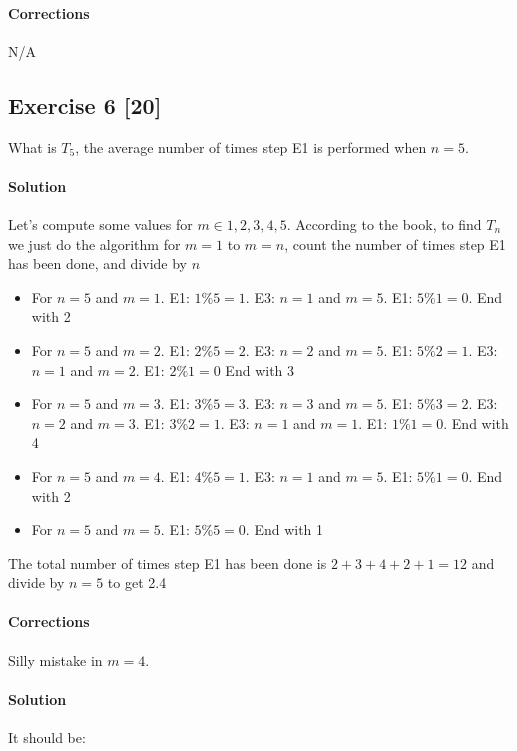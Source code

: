 \documentclass{report}
\begin{document}
			\paragraph{Corrections} N/A
			
		
		\subsection*{Exercise 6 [20]}
		
			What is $T_5$, the average number of times step E1 is performed when $n=5$.
			
			\paragraph{Solution} Let's compute some values for $m \in {1,2,3,4,5}$. According to the book, to find $T_n$ we just do the algorithm for $m=1$ to $m=n$, count the number of times step E1 has been done, and divide by $n$
			
			\begin{itemize}
				\item For $n=5$ and $m=1$. E1: $1\%5 = 1$. E3: $n=1$ and $m=5$. E1: $5\%1=0$. End with 2
				
				\item For $n=5$ and $m=2$. E1: $2\%5 = 2$. E3: $n=2$ and $m=5$. E1: $5\%2=1$. E3: $n=1$ and $m=2$. E1: $2\%1 = 0$ End with 3
				
				\item For $n=5$ and $m=3$. E1: $3\%5 = 3$. E3: $n=3$ and $m=5$. E1: $5\%3=2$. E3: $n=2$ and $m=3$. E1: $3\%2=1$. E3: $n=1$ and $m=1$. E1: $1\%1=0$. End with 4
				
				\item For $n=5$ and $m=4$. E1: $4\%5 = 1$. E3: $n=1$ and $m=5$. E1: $5\%1=0$. End with 2
				
				\item For $n=5$ and $m=5$. E1: $5\%5 = 0$. End with 1
			\end{itemize}
		
			The total number of times step E1 has been done is $2+3+4+2+1=12$ and divide by $n=5$ to get 2.4 
			
			\paragraph{Corrections} Silly mistake in $m=4$. 
			
			\paragraph{Solution} It should be:
			
\end{document}
